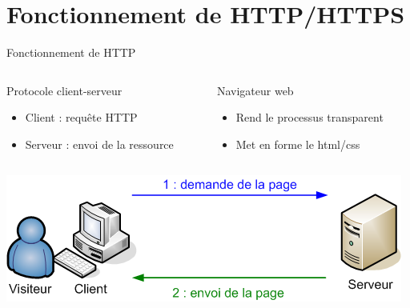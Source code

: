 \section{Fonctionnement de HTTP/HTTPS}


\begin{frame}{Fonctionnement de HTTP}
    \begin{columns}
        \begin{column}{0.5\textwidth}
            \begin{block}{Protocole client-serveur}
                \begin{itemize}
                    \item{Client : requête HTTP}
                    \item{Serveur : envoi de la ressource}
                \end{itemize}
            \end{block}
        \end{column}

        \begin{column}{0.5\textwidth}
            \begin{exampleblock}{Navigateur web}
                \begin{itemize}
                    \item{Rend le processus transparent}
                    \item{Met en forme le html/css}
                \end{itemize}
            \end{exampleblock}
        \end{column}
    \end{columns}

    \hspace{40cm}

    \includegraphics[width=\linewidth]{../medias/requete-http.png}
\end{frame}

